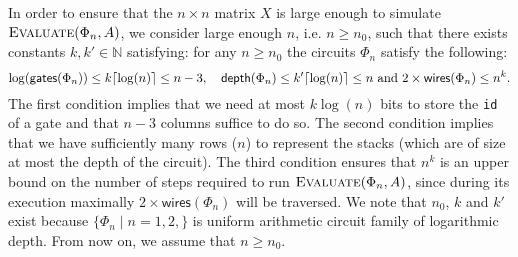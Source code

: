 In order to ensure that the $n\times n$ matrix $X$ is large enough to simulate $\textsc{Evaluate}(\Phi_n,A)$, we consider large enough $n$, i.e. $n\geq n_0$, such that there exists constants $k,k'\in\mathbb{N}$ satisfying: for any $n\geq n_0$ the circuits $\Phi_n$ satisfy the following:
$$        \log(\mathsf{gates}(\Phi_n)) \leq k\lceil\log(n)\rceil\leq n-3, \quad  \mathsf{depth}(\Phi_n)\leq k' \lceil\log(n)\rceil \leq n       
		 \text{ and }
   2\times\mathsf{wires}(\Phi_n)\leq n^k.  
$$
The first condition implies that we need at most $k\log (n)$ bits to store the \texttt{id} of a gate and that $n-3$ columns suffice to do so.
The second condition implies that we have sufficiently many rows ($n$) to
represent the stacks (which are of size at most the depth of the circuit). The third condition ensures that $n^k$ is an upper bound on the number
of steps required to run $\textsc{Evaluate}(\Phi_n,A)$, since during its execution maximally $2\times\mathsf{wires}(\Phi_n)$ will be traversed.
We note that
$n_0$, $k$ and $k'$ exist because $\{\Phi_n\mid n=1,2, \}$ is  uniform arithmetic circuit family of logarithmic depth. 
From now on, we assume
that $n\geq n_0$. 


%


